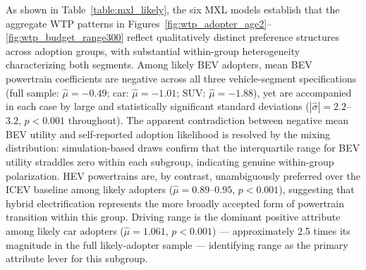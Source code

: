\documentclass[a4paper,fleqn]{cas-sc}   %
\begin{document}
As shown in Table~\ref{table:mxl_likely}, the six MXL models establish that the aggregate WTP patterns in Figures~\ref{fig:wtp_adopter_age2}--\ref{fig:wtp_budget_range300} reflect qualitatively distinct preference structures across adoption groups, with substantial within-group heterogeneity characterizing both segments. Among likely BEV adopters, mean BEV powertrain coefficients are negative across all three vehicle-segment specifications (full sample: $\hat{\mu} = -0.49$; car: $\hat{\mu} = -1.01$; SUV: $\hat{\mu} = -1.88$), yet are accompanied in each case by large and statistically significant standard deviations ($|\hat{\sigma}| = 2.2$--$3.2$, $p < 0.001$ throughout). The apparent contradiction between negative mean BEV utility and self-reported adoption likelihood is resolved by the mixing distribution: simulation-based draws confirm that the interquartile range for BEV utility straddles zero within each subgroup, indicating genuine within-group polarization. HEV powertrains are, by contrast, unambiguously preferred over the ICEV baseline among likely adopters ($\hat{\mu} = 0.89$--$0.95$, $p < 0.001$), suggesting that hybrid electrification represents the more broadly accepted form of powertrain transition within this group. Driving range is the dominant positive attribute among likely car adopters ($\hat{\mu} = 1.061$, $p < 0.001$) --- approximately 2.5 times its magnitude in the full likely-adopter sample --- identifying range as the primary attribute lever for this subgroup.
\end{document}
